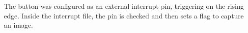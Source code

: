 The button was configured as an external interrupt pin, triggering on the rising edge. Inside the interrupt file, the pin is checked and then sets a flag to capture an image.